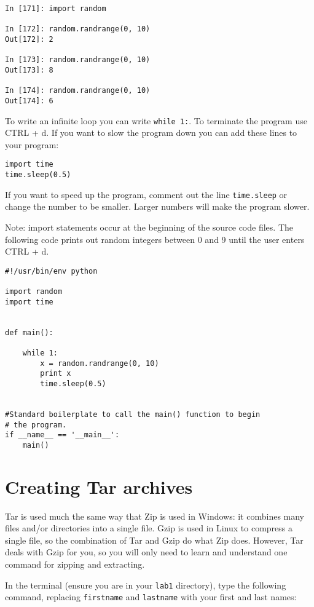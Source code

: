 \documentclass[12pt]{article}
\begin{document}
\begin{lstlisting}[style=bash]
In [171]: import random

In [172]: random.randrange(0, 10)
Out[172]: 2

In [173]: random.randrange(0, 10)
Out[173]: 8

In [174]: random.randrange(0, 10)
Out[174]: 6
\end{lstlisting}

To write an infinite loop you can write \texttt{while 1:}. To terminate the program use CTRL + d. If you want to slow the program down you can add these lines to your program:

\begin{lstlisting}[style=c]
import time
time.sleep(0.5)
\end{lstlisting}

If you want to speed up the program, comment out the line \texttt{time.sleep} or change the number to be smaller. Larger numbers will make the program slower.

Note: import statements occur at the beginning of the source code files. The following code prints out random integers between 0 and 9 until the user enters CTRL + d.

\begin{lstlisting}[style=c]
#!/usr/bin/env python

import random
import time


def main():

    while 1:
        x = random.randrange(0, 10)
        print x
        time.sleep(0.5)


#Standard boilerplate to call the main() function to begin
# the program.
if __name__ == '__main__':
    main()
\end{lstlisting}


\section{Creating Tar archives}

Tar is used much the same way that Zip is used in Windows: it combines many files and/or directories into a single file. Gzip is used in Linux to compress a single file, so the combination of Tar and Gzip do what Zip does. However, Tar deals with Gzip for you, so you will only need to learn and understand one command for zipping and extracting.

In the terminal (ensure you are in your \texttt{lab1} directory), type the following command, replacing \texttt{firstname} and \texttt{lastname} with your first and last names:
\end{document}
